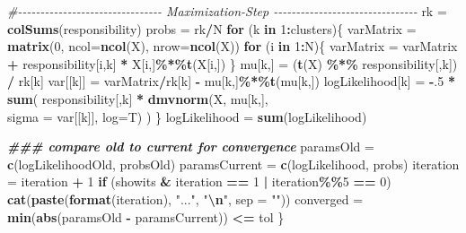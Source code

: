 \documentclass[
]{article}
\newenvironment{Shaded}{\begin{snugshade}}{\end{snugshade}}
\newcommand{\AttributeTok}[1]{\textcolor[rgb]{0.13,0.29,0.53}{#1}}
\newcommand{\CommentTok}[1]{\textcolor[rgb]{0.56,0.35,0.01}{\textit{#1}}}
\newcommand{\ControlFlowTok}[1]{\textcolor[rgb]{0.13,0.29,0.53}{\textbf{#1}}}
\newcommand{\DecValTok}[1]{\textcolor[rgb]{0.00,0.00,0.81}{#1}}
\newcommand{\DocumentationTok}[1]{\textcolor[rgb]{0.56,0.35,0.01}{\textbf{\textit{#1}}}}
\newcommand{\FunctionTok}[1]{\textcolor[rgb]{0.13,0.29,0.53}{\textbf{#1}}}
\newcommand{\NormalTok}[1]{#1}
\newcommand{\OtherTok}[1]{\textcolor[rgb]{0.56,0.35,0.01}{#1}}
\newcommand{\SpecialCharTok}[1]{\textcolor[rgb]{0.81,0.36,0.00}{\textbf{#1}}}
\newcommand{\StringTok}[1]{\textcolor[rgb]{0.31,0.60,0.02}{#1}}
\begin{document}
\begin{Shaded}
\begin{Highlighting}[]
\CommentTok{\#{-}{-}{-}{-}{-}{-}{-}{-}{-}{-}{-}{-}{-}{-}{-}{-}{-}{-}{-}{-}{-}{-}{-}{-}{-}{-}{-}{-}{-}{-}{-}{-} Maximization{-}Step {-}{-}{-}{-}{-}{-}{-}{-}{-}{-}{-}{-}{-}{-}{-}{-}{-}{-}{-}{-}{-}{-}{-}{-}{-}{-}{-}{-}{-}{-}{-}{-}}
\NormalTok{    rk }\OtherTok{=} \FunctionTok{colSums}\NormalTok{(responsibility)}
\NormalTok{    probs }\OtherTok{=}\NormalTok{ rk}\SpecialCharTok{/}\NormalTok{N}
    \ControlFlowTok{for}\NormalTok{ (k }\ControlFlowTok{in} \DecValTok{1}\SpecialCharTok{:}\NormalTok{clusters)\{}
\NormalTok{      varMatrix }\OtherTok{=} \FunctionTok{matrix}\NormalTok{(}\DecValTok{0}\NormalTok{, }\AttributeTok{ncol=}\FunctionTok{ncol}\NormalTok{(X), }\AttributeTok{nrow=}\FunctionTok{ncol}\NormalTok{(X))}
      \ControlFlowTok{for}\NormalTok{ (i }\ControlFlowTok{in} \DecValTok{1}\SpecialCharTok{:}\NormalTok{N)\{}
\NormalTok{        varMatrix }\OtherTok{=}\NormalTok{ varMatrix }\SpecialCharTok{+}\NormalTok{ responsibility[i,k] }\SpecialCharTok{*}\NormalTok{ X[i,]}\SpecialCharTok{\%*\%}\FunctionTok{t}\NormalTok{(X[i,])}
\NormalTok{      \}}
\NormalTok{      mu[k,] }\OtherTok{=}\NormalTok{ (}\FunctionTok{t}\NormalTok{(X) }\SpecialCharTok{\%*\%}\NormalTok{ responsibility[,k]) }\SpecialCharTok{/}\NormalTok{ rk[k]}
\NormalTok{      var[[k]] }\OtherTok{=}\NormalTok{  varMatrix}\SpecialCharTok{/}\NormalTok{rk[k] }\SpecialCharTok{{-}}\NormalTok{ mu[k,]}\SpecialCharTok{\%*\%}\FunctionTok{t}\NormalTok{(mu[k,])}
\NormalTok{      logLikelihood[k] }\OtherTok{=} \SpecialCharTok{{-}}\NormalTok{.}\DecValTok{5} \SpecialCharTok{*} \FunctionTok{sum}\NormalTok{( responsibility[,k] }\SpecialCharTok{*} \FunctionTok{dmvnorm}\NormalTok{(X, mu[k,], }\\
\AttributeTok{sigma =}\NormalTok{ var[[k]], }\AttributeTok{log=}\NormalTok{T) )}
\NormalTok{    \}}
\NormalTok{    logLikelihood }\OtherTok{=} \FunctionTok{sum}\NormalTok{(logLikelihood)}
    
    \DocumentationTok{\#\#\# compare old to current for convergence}
\NormalTok{    paramsOld }\OtherTok{=}  \FunctionTok{c}\NormalTok{(logLikelihoodOld, probsOld)}
\NormalTok{    paramsCurrent }\OtherTok{=} \FunctionTok{c}\NormalTok{(logLikelihood, probs)}
\NormalTok{    iteration }\OtherTok{=}\NormalTok{ iteration }\SpecialCharTok{+} \DecValTok{1}
    \ControlFlowTok{if}\NormalTok{ (showits }\SpecialCharTok{\&}\NormalTok{ iteration }\SpecialCharTok{==} \DecValTok{1} \SpecialCharTok{|}\NormalTok{ iteration}\SpecialCharTok{\%\%}\DecValTok{5} \SpecialCharTok{==} \DecValTok{0}\NormalTok{)}
      \FunctionTok{cat}\NormalTok{(}\FunctionTok{paste}\NormalTok{(}\FunctionTok{format}\NormalTok{(iteration), }\StringTok{"..."}\NormalTok{, }\StringTok{"}\SpecialCharTok{\textbackslash{}n}\StringTok{"}\NormalTok{, }\AttributeTok{sep =} \StringTok{""}\NormalTok{))}
\NormalTok{    converged }\OtherTok{=} \FunctionTok{min}\NormalTok{(}\FunctionTok{abs}\NormalTok{(paramsOld }\SpecialCharTok{{-}}\NormalTok{ paramsCurrent)) }\SpecialCharTok{\textless{}=}\NormalTok{ tol}
\NormalTok{  \}}
  

\end{Highlighting}
\end{Shaded}
\end{document}
